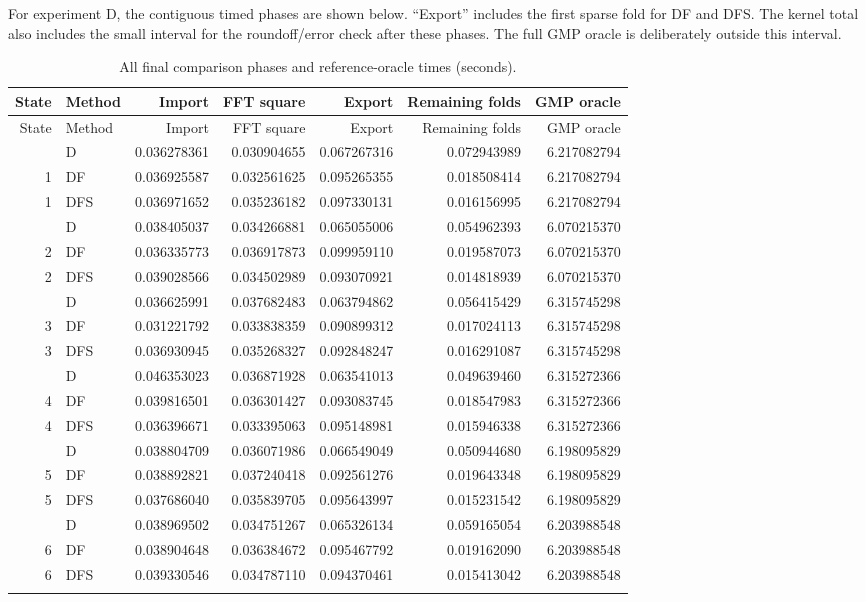 \documentclass[11pt,a4paper]{article}
\theoremstyle{definition}
\begin{document}
For experiment D, the contiguous timed phases are shown below. ``Export''
includes the first sparse fold for DF and DFS. The kernel total also
includes the small interval for the roundoff/error check after these phases.
The full GMP oracle is deliberately outside this interval.
\begingroup\footnotesize
\setlength{\tabcolsep}{4pt}
\begin{longtable}{@{}r l r r r r r@{}}
\caption{All final comparison phases and reference-oracle times (seconds).}\\
\toprule
State & Method & Import & FFT square & Export & Remaining folds & GMP oracle\\
\midrule\endfirsthead
\toprule
State & Method & Import & FFT square & Export & Remaining folds & GMP oracle\\
\midrule\endhead
\bottomrule\endlastfoot
1 & D & 0.036278361 & 0.030904655 & 0.067267316 & 0.072943989 & 6.217082794 \\
1 & DF & 0.036925587 & 0.032561625 & 0.095265355 & 0.018508414 & 6.217082794 \\
1 & DFS & 0.036971652 & 0.035236182 & 0.097330131 & 0.016156995 & 6.217082794 \\
\addlinespace
2 & D & 0.038405037 & 0.034266881 & 0.065055006 & 0.054962393 & 6.070215370 \\
2 & DF & 0.036335773 & 0.036917873 & 0.099959110 & 0.019587073 & 6.070215370 \\
2 & DFS & 0.039028566 & 0.034502989 & 0.093070921 & 0.014818939 & 6.070215370 \\
\addlinespace
3 & D & 0.036625991 & 0.037682483 & 0.063794862 & 0.056415429 & 6.315745298 \\
3 & DF & 0.031221792 & 0.033838359 & 0.090899312 & 0.017024113 & 6.315745298 \\
3 & DFS & 0.036930945 & 0.035268327 & 0.092848247 & 0.016291087 & 6.315745298 \\
\addlinespace
4 & D & 0.046353023 & 0.036871928 & 0.063541013 & 0.049639460 & 6.315272366 \\
4 & DF & 0.039816501 & 0.036301427 & 0.093083745 & 0.018547983 & 6.315272366 \\
4 & DFS & 0.036396671 & 0.033395063 & 0.095148981 & 0.015946338 & 6.315272366 \\
\addlinespace
5 & D & 0.038804709 & 0.036071986 & 0.066549049 & 0.050944680 & 6.198095829 \\
5 & DF & 0.038892821 & 0.037240418 & 0.092561276 & 0.019643348 & 6.198095829 \\
5 & DFS & 0.037686040 & 0.035839705 & 0.095643997 & 0.015231542 & 6.198095829 \\
\addlinespace
6 & D & 0.038969502 & 0.034751267 & 0.065326134 & 0.059165054 & 6.203988548 \\
6 & DF & 0.038904648 & 0.036384672 & 0.095467792 & 0.019162090 & 6.203988548 \\
6 & DFS & 0.039330546 & 0.034787110 & 0.094370461 & 0.015413042 & 6.203988548 \\
\addlinespace
\end{longtable}\endgroup
\end{document}
